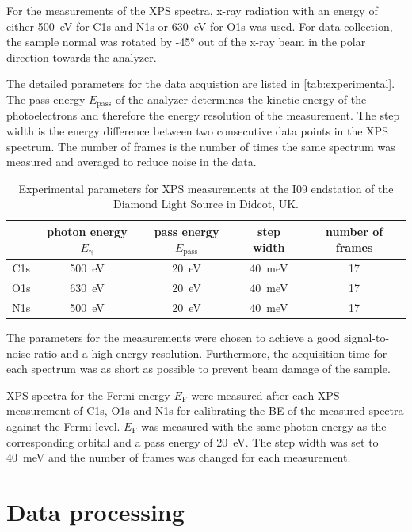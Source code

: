 For the measurements of the \ac{XPS} spectra, x-ray radiation with an energy of either 500~\si{\eV} for C1s and N1s or 630~\si{\eV} for O1s was used. For data collection, the sample normal was rotated by -45\si{\degree} out of the x-ray beam in the polar direction towards the analyzer.

The detailed parameters for the data acquistion are listed in \autoref{tab:experimental}. The pass energy $E_\mathrm{pass}$ of the analyzer determines the kinetic energy of the photoelectrons and therefore the energy resolution of the measurement. The step width is the energy difference between two consecutive data points in the \ac{XPS} spectrum. The number of frames is the number of times the same spectrum was measured and averaged to reduce noise in the data.

\begin{table}[H]
	\centering
	\caption{Experimental parameters for \ac{XPS} measurements at the I09 endstation of the Diamond Light Source in Didcot, UK.}
	\begin{tabular}{@{}ccccc@{}} \toprule
		& photon energy $E_\mathrm{\gamma}$ & pass energy $E_\mathrm{pass}$ & step width & number of frames \\
		\midrule
		C1s & 500~\si{\eV} & 20~\si{\eV} & 40~\si{meV} & 17 \\ 
		O1s & 630~\si{\eV} & 20~\si{\eV} & 40~\si{meV} & 17 \\ 
		N1s & 500~\si{\eV} & 20~\si{\eV} & 40~\si{meV} & 17 \\
		\bottomrule
	\end{tabular}
	\label{tab:experimental}
\end{table}

The parameters for the measurements were chosen to achieve a good signal-to-noise ratio and a high energy resolution. Furthermore, the acquisition time for each spectrum was as short as possible to prevent beam damage of the sample.

\Ac{XPS} spectra for the Fermi energy $E_\mathrm{F}$ were measured after each \ac{XPS} measurement of C1s, O1s and N1s for calibrating the \ac{BE} of the measured spectra against the Fermi level. $E_\mathrm{F}$ was measured with the same photon energy as the corresponding orbital and a pass energy of 20~\si{\eV}. The step width was set to 40~\si{meV} and the number of frames was changed for each measurement.

\section{Data processing}


